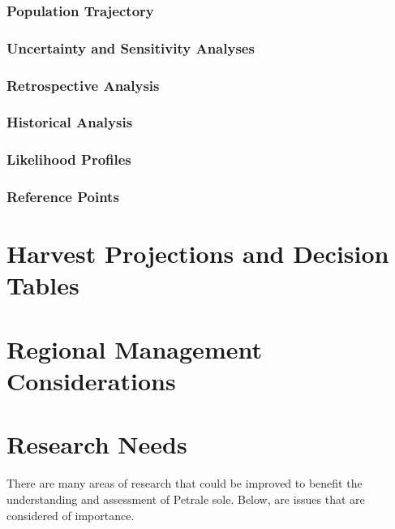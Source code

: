 \documentclass[12pt,]{article}
\begin{document}
\subsubsection{Population Trajectory}\label{population-trajectory}

\subsubsection{Uncertainty and Sensitivity
Analyses}\label{uncertainty-and-sensitivity-analyses}

\subsubsection{Retrospective Analysis}\label{retrospective-analysis}

\subsubsection{Historical Analysis}\label{historical-analysis}

\subsubsection{Likelihood Profiles}\label{likelihood-profiles}

\subsubsection{Reference Points}\label{reference-points-1}

\section{Harvest Projections and Decision
Tables}\label{harvest-projections-and-decision-tables}

\section{Regional Management
Considerations}\label{regional-management-considerations}

\section{Research Needs}\label{research-needs}

There are many areas of research that could be improved to benefit the
understanding and assessment of Petrale sole. Below, are issues that are
considered of importance.
\end{document}

